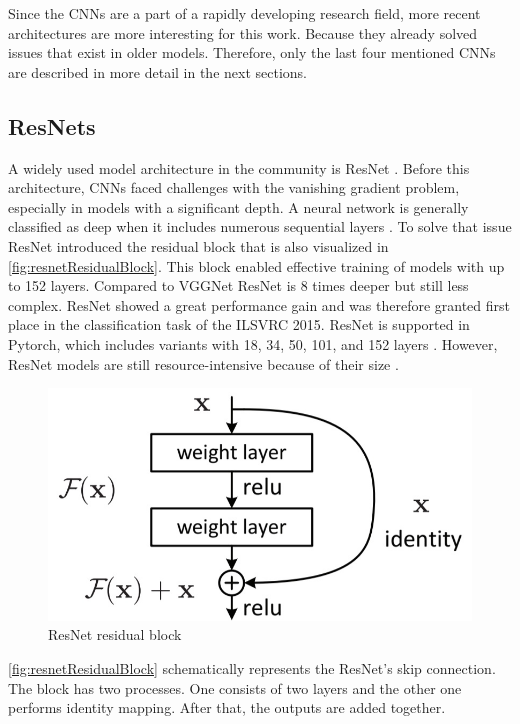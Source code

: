 \vspace{1cm} %

\noindent Since the \ac{CNN}s are a part of a rapidly developing research field, more recent architectures are more interesting for this work.
Because they already solved issues that exist in older models.
Therefore, only the last four mentioned \ac{CNN}s are described in more detail in the next sections.

\subsection{ResNets}

A widely used model architecture in the community is ResNet \cite{ResNet}.
Before this architecture, \ac{CNN}s faced challenges with the vanishing gradient problem, especially in models with a significant depth.
A neural network is generally classified as deep when it includes numerous sequential layers \cite{ResNet}.
To solve that issue ResNet introduced the residual block that is also visualized in \autoref{fig:resnetResidualBlock}.
This block enabled effective training of models with up to 152 layers. Compared to VGGNet ResNet is 8 times deeper but still less complex.
ResNet showed a great performance gain and was therefore granted first place in the classification task of the ILSVRC 2015.
ResNet is supported in Pytorch, which includes variants with 18, 34, 50, 101, and 152 layers \cite{pytorchresnet}. 
However, ResNet models are still resource-intensive because of their size \cite{networkArchitectureSurvey}. 

\begin{figure}[H]
    \centering
    \includegraphics[width=0.5\linewidth]{PICs/backbones/resnet_residualBlock.jpg}
    \caption{ResNet residual block \cite{ResNet}}
    \label{fig:resnetResidualBlock}
\end{figure}

\noindent \autoref{fig:resnetResidualBlock} schematically represents the ResNet's skip connection.
The block has two processes.
One consists of two layers and the other one performs identity mapping.
After that, the outputs are added together.

